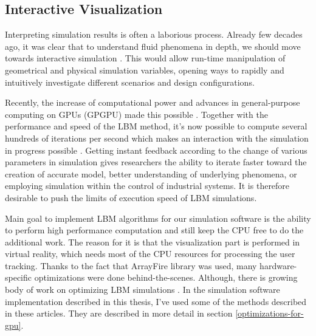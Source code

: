 
\subsection{Interactive Visualization}
\label{interactive-simulation}
Interpreting simulation results is often a laborious process. Already few decades ago, it was clear that to understand fluid phenomena in depth, we should move towards interactive simulation \citep{frischLatticeGasAutomataNavierStokes1986}. This would allow run-time manipulation of geometrical and physical simulation variables, opening ways to rapidly and intuitively investigate different scenarios and design configurations.

Recently, the increase of computational power and advances in general-purpose computing on GPUs (GPGPU) made this possible  \citep{delboscRealTimeSimulationIndoor, harwoodParallelisationInteractiveLatticeBoltzmann2017, kolihaOnlineVisualizationInteractive2015, glessmerUsingInteractiveLattice2017}. Together with the performance and speed of the LBM method, it's now possible to compute several hundreds of iterations per second which makes an interaction with the simulation in progress possible \citep{wangInteractive3DFluid2019}. Getting instant feedback according to the change of various parameters in simulation gives researchers the ability to iterate faster toward the creation of accurate model, better understanding of underlying phenomena, or employing simulation within the control of industrial systems. It is therefore desirable to push the limits of execution speed of LBM simulations.

Main goal to implement LBM algorithms for our simulation software is the ability to perform high performance computation and still keep the CPU free to do the additional work. The reason for it is that the visualization part is performed in virtual reality, which needs most of the CPU resources for processing the user tracking. Thanks to the fact that ArrayFire library was used, many hardware-specific optimizations were done behind-the-scenes. Although, there is growing body of work on optimizing LBM simulations \citep{wangInteractive3DFluid2019, wittmannLatticeBoltzmannBenchmark2018, tranPerformanceOptimization3D2017, kornerParallelLatticeBoltzmann2006, harwoodParallelisationInteractiveLatticeBoltzmann2017, harwoodREALTIMEMODELLINGSIMULATION}. In the simulation software implementation described in this thesis, I've used some of the methods described in these articles. They are described in more detail in section \ref{optimizations-for-gpu}.

